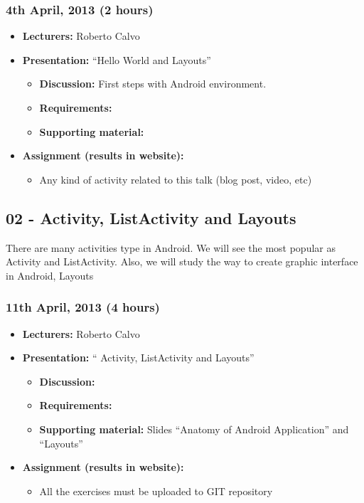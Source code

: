 \documentclass[a4paper]{article}
\begin{document}

\subsubsection{4th April, 2013 (2 hours)}

\begin{itemize}
\item \textbf{Lecturers:} Roberto Calvo
\item \textbf{Presentation:} ``Hello World and Layouts''
  \begin{itemize}
  \item \textbf{Discussion:} First steps with Android environment.
  \item \textbf{Requirements:} 
  \item \textbf{Supporting material:}
  \end{itemize}
\item \textbf{Assignment (results in website):}
  \begin{itemize}
  \item Any kind of activity
    related to this talk (blog post, video, etc)
  \end{itemize}
\end{itemize}


\subsection{02 - Activity, ListActivity and Layouts}

There are many activities type in Android. We will see the most
popular as Activity and ListActivity. Also, we will study the way to
create graphic interface in Android, Layouts

\subsubsection{11th April, 2013 (4 hours)}

\begin{itemize}
\item \textbf{Lecturers:} Roberto Calvo
\item \textbf{Presentation:} `` Activity, ListActivity and Layouts''
  \begin{itemize}
  \item \textbf{Discussion:}
  \item \textbf{Requirements:} 
  \item \textbf{Supporting material:} Slides ``Anatomy of Android
    Application'' and ``Layouts''
  \end{itemize}
\item \textbf{Assignment (results in website):} 
  \begin{itemize}
  \item All the exercises must be uploaded to GIT repository
  \end{itemize}
\end{itemize}
\end{document}
